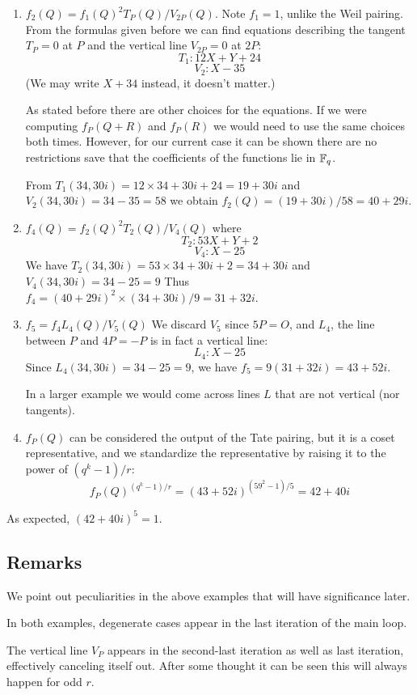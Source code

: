 \begin{enumerate}
\item
$f_2(Q) = f_1(Q)^2 T_P (Q) / V_{2P}(Q)$.
Note $f_1 = 1$, unlike the Weil pairing.
From the formulas given before we can find equations describing
the tangent $T_P = 0$ at $P$ and the vertical line $V_{2P} = 0$ at $2P$:
\[ T_1 : 12 X + Y + 24 \]
\[ V_2 : X - 35 \]
(We may write $X + 34$ instead, it doesn't matter.)

As stated before there are other choices for the equations.
If we were computing $f_P(Q+R)$ and $f_P(R)$ we would need
to use the same choices both times. However, for our current case it
can be shown there are no restrictions save that the coefficients of the
functions lie in $\mathbb{F}_q$.

From
$T_1(34, 30i) = 12 \times 34 + 30i + 24 = 19 + 30i$ and
$V_2(34, 30i) = 34 - 35 = 58$
we obtain $f_2(Q) = (19 + 30i) / 58 =  40 + 29i$.
\item
$f_4(Q) = f_2(Q) ^2 T_2 (Q) / V_4(Q)$ where
\[ T_2 : 53 X + Y + 2 \]
\[ V_4 : X - 25 \]
We have
$T_2(34,30i) = 53 \times 34 + 30i + 2 = 34 + 30i$ and
$V_4(34,30i) = 34 - 25 = 9$ Thus
$f_4 = (40 + 29i)^2 \times (34+30i) / 9 = 31 + 32i$.
\item
$f_5 = f_4 L_4(Q) / V_5(Q)$
We discard $V_5$ since $5P = O$, and $L_4$, the line between $P$ and $4P = -P$
is in fact a vertical line:
\[ L_4: X - 25 \]
Since
$L_4(34, 30i) = 34 - 25 = 9$, we have
$f_5 = 9(31 + 32i) = 43 + 52i$.

In a larger example we would
come across lines $L$ that are not vertical (nor tangents).
\item
$f_P(Q)$ can be considered the output of the Tate pairing,
but it is a coset representative, and we standardize the representative
by raising it to the power of $(q^k - 1)/r$:
\[ f_P(Q)^{(q^k-1)/r} = (43+52i)^{(59^2 - 1)/5} = 42+40i \]
\end{enumerate}

As expected, $(42 + 40i)^5 = 1$.

\subsection {Remarks}
We point out peculiarities in the above examples that will have significance
later.

In both examples, degenerate cases appear in the last iteration of the main
loop.

The vertical line $V_P$ appears in the second-last iteration as well as last
iteration, effectively canceling itself out. After some thought it can be seen
this will always happen for odd $r$.

